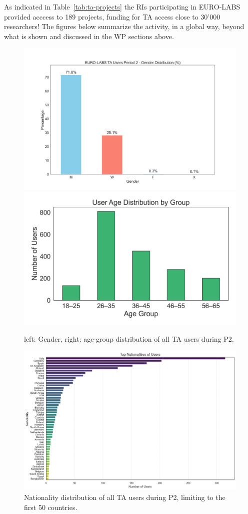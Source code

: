 
\label{sec:clear-meas-details}




As indicated in Table~\ref{tab:ta-projects} the RIs participating in EURO-LABS provided acccess to 189 projects, funding for TA access close to 30'000 researchers! The figures below summarize the activity, in a global way, beyond what is shown and discussed in the WP sections above. 

\begin{figure}[H]
    \centering
    \includegraphics[width=0.48\linewidth]{graphics/p2-gender_distribution.png} 
    \includegraphics[width=0.48\linewidth]{graphics/user_age_group_distribution.png}
    \caption{left: Gender, right: age-group distribution of all TA users during P2. }
    \label{fig:p2-gender}
\end{figure}

\begin{figure}[H]
    \centering
    \includegraphics[width=0.8\linewidth]{graphics/P2Users-usernat.png}
    \caption{Nationality distribution of all TA users during P2, limiting to the first 50 countries.}
    \label{fig:p2-age-group}
\end{figure}


